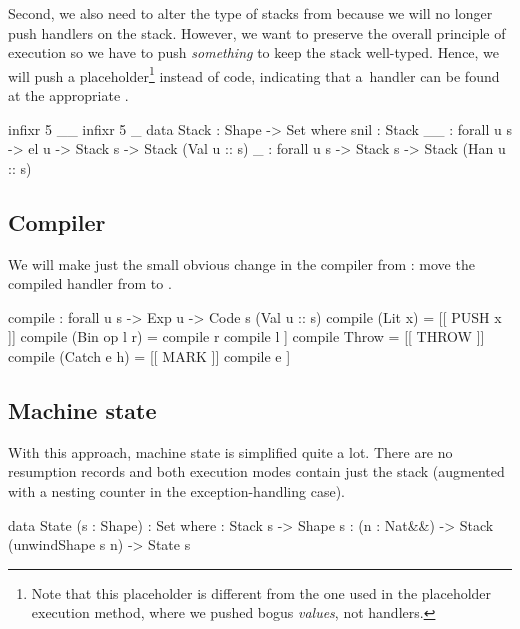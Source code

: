 Second, we also need to alter the type of stacks from 
because we will no longer push handlers on the stack. However, we want to
preserve the overall principle of execution so we have to push \emph{something}
to keep the stack well-typed.  Hence, we will push a placeholder\footnote{ Note
that this placeholder is different from the one used in the placeholder
execution method, where we pushed bogus \emph{values}, not handlers.} instead
of code, indicating that a~handler can be found at the appropriate
.

\noindent \begin{minipage}{\textwidth}
\begin{code}
  infixr 5 _\scons\_
  infixr 5 \void\sconsh\_
  data Stack : Shape -> Set where
    snil : Stack \NIL
    _\scons\_ : forall {u s} -> el u -> Stack s -> Stack (Val u :: s)
    \void\sconsh\_ : forall {u s} -> Stack s -> Stack (Han u :: s)
\end{code}
\end{minipage}

\subsection{Compiler}

We will make just the small obvious change in the compiler from
: move the compiled handler from  to .

\label{sec:hau-compile}\begin{code}
compile : forall {u s} -> Exp u -> Code s (Val u :: s)
compile (Lit x) = [[ PUSH x ]]
compile (Bin op l r) = compile r \app compile l \app [[ opInstr op ]] 
compile Throw = [[ THROW ]]
compile (Catch e h) = [[ MARK ]] \app compile e \app [[ UNMARK (compile h) ]]
\end{code}

\subsection{Machine state}

With this approach, machine state is simplified quite a lot. There are no
resumption records and both execution modes contain just the stack (augmented
with a nesting counter in the exception-handling case).

\begin{code}
  data State (s : Shape) : Set where
    \tick[_] : Stack s -> Shape s
    \x[_,_] : (n : Nat&\!&) -> Stack (unwindShape s n) -> State s
\end{code}

